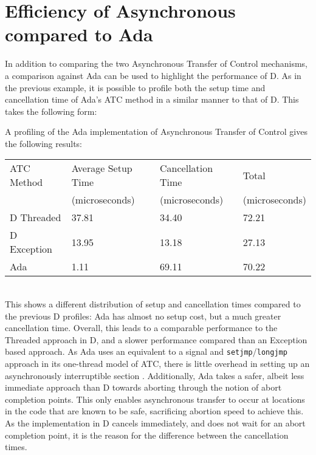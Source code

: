 \section{Efficiency of Asynchronous compared to Ada}
In addition to comparing the two Asynchronous Transfer of Control mechanisms, a
comparison against Ada can be used to highlight the performance of D. As in the
previous example, it is possible to profile both the setup time and cancellation
time of Ada's ATC method in a similar manner to that of D. This takes the
following form: 

A profiling of the Ada implementation of Asynchronous Transfer of Control gives
the following results: 
\begin{table}[!htbp]
\begin{tabular}{l|lll}
ATC Method & Average Setup Time & Cancellation Time  & Total          \\
           & (microseconds)     & (microseconds)     & (microseconds) \\ \hline
D Threaded &  37.81             & 34.40              & 72.21          \\
D Exception & 13.95             & 13.18              & 27.13          \\
Ada         &  1.11             & 69.11              & 70.22          \\
\end{tabular}
\end{table} \\
This shows a different distribution of setup and cancellation times compared to
the previous D profiles: Ada has almost no setup cost, but a much greater
cancellation time. Overall, this leads to a comparable performance to the
Threaded approach in D, and a slower performance compared than an Exception
based approach. As Ada uses an equivalent to a signal and \texttt{setjmp}/\texttt{longjmp} 
approach in its one-thread model of ATC, there is little overhead in setting up
an asynchronously interruptible section \cite{atc-article}. Additionally, Ada takes
a safer, albeit less immediate approach than D towards aborting through the
notion of abort completion points. This only enables asynchronous transfer to
occur at locations in the code that are known to be safe, sacrificing abortion
speed to achieve this. As the implementation in D cancels immediately, and does 
not wait for an abort completion point, it is the reason for the difference between 
the cancellation times. 

